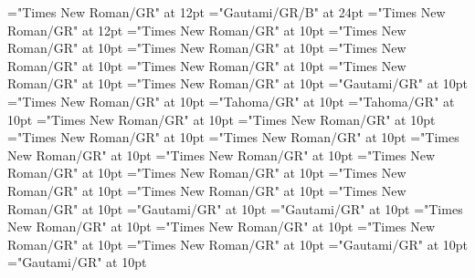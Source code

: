 \documentclass[a4paper]{article}
\begin{document}
\pagestyle{plain}
\sloppy
\setlength{\parfillskip}{0pt plus 1fil}
\font{}="Times New Roman/GR" at 12pt
\font{}="Gautami/GR/B" at 24pt
\font{}="Times New Roman/GR" at 12pt
\font\entryletDatadicBody="Times New Roman/GR" at 10pt
\font\pictureRightentryletDatadicBody="Times New Roman/GR" at 10pt
\font\picturepictureRightentryletDatadicBody="Times New Roman/GR" at 10pt
\font\pictureCaptionpictureRightentryletDatadicBody="Times New Roman/GR" at 10pt
\font\CmPicturepublishStemPileThumbnailPubpictureCaptionpictureRightentryletDatadicBody="Times New Roman/GR" at 10pt
\font\pictureLabelenpictureCaptionpictureRightentryletDatadicBody="Times New Roman/GR" at 10pt
\font\spanenpictureLabelenpictureCaptionpictureRightentryletDatadicBody="Times New Roman/GR" at 10pt
\font\headwordggoTeluxINentryletDatadicBody="Gautami/GR" at 10pt
\font\pronunciationsentryletDatadicBody="Times New Roman/GR" at 10pt
\font\pronunciationggofonipaxemicpronunciationsentryletDatadicBody="Tahoma/GR" at 10pt
\font\spanggofonipaxemicpronunciationggofonipaxemicpronunciationsentryletDatadicBody="Tahoma/GR" at 10pt
\font\sensesentryletDatadicBody="Times New Roman/GR" at 10pt
\font\sensesensesentryletDatadicBody="Times New Roman/GR" at 10pt
\font\grammaticalinfosensesensesentryletDatadicBody="Times New Roman/GR" at 10pt
\font\partofspeechengrammaticalinfosensesensesentryletDatadicBody="Times New Roman/GR" at 10pt
\font\spanenpartofspeechengrammaticalinfosensesensesentryletDatadicBody="Times New Roman/GR" at 10pt
\font\xsensenumbersensesentryletDatadicBody="Times New Roman/GR" at 10pt
\font{}="Times New Roman/GR" at 10pt
\font\spanendefinitionensensesensesentryletDatadicBody="Times New Roman/GR" at 10pt
\font\LexSensepublishStemGlossPubensensesensesentryletDatadicBody="Times New Roman/GR" at 10pt
\font\spanenLexSensepublishStemGlossPubensensesensesentryletDatadicBody="Times New Roman/GR" at 10pt
\font\examplessensesensesentryletDatadicBody="Times New Roman/GR" at 10pt
\font\exampleggoTeluxINexamplessensesensesentryletDatadicBody="Gautami/GR" at 10pt
\font\spanggoTeluxINexampleggoTeluxINexamplessensesensesentryletDatadicBody="Gautami/GR" at 10pt
\font\translationsexamplessensesensesentryletDatadicBody="Times New Roman/GR" at 10pt
\font\translationentranslationsexamplessensesensesentryletDatadicBody="Times New Roman/GR" at 10pt
\font\xitementranslationentranslationsexamplessensesensesentryletDatadicBody="Times New Roman/GR" at 10pt
\font\spanenxitementranslationentranslationsexamplessensesensesentryletDatadicBody="Times New Roman/GR" at 10pt
\font\xitemtetranslationentranslationsexamplessensesensesentryletDatadicBody="Gautami/GR" at 10pt
\font\spantexitemtetranslationentranslationsexamplessensesensesentryletDatadicBody="Gautami/GR" at 10pt
\end{document}
